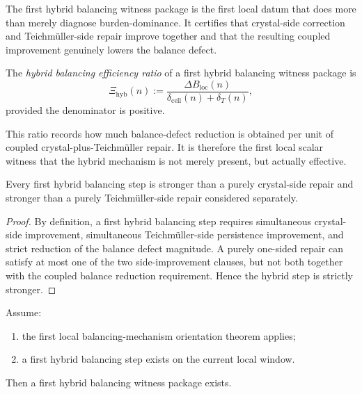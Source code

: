 \begin{remark}
\label{rem:meaning-of-the-hybrid-witness-package}
The first hybrid balancing witness package is the first local datum that does more than merely diagnose burden-dominance.
It certifies that crystal-side correction and Teichm\"uller-side repair improve together and that the resulting coupled improvement genuinely lowers the balance defect.
\end{remark}

\begin{definition}
\label{def:hybrid-balancing-efficiency-ratio}
The \emph{hybrid balancing efficiency ratio} of a first hybrid balancing witness package is
\[
 \Xi_{\mathrm{hyb}}(n)
 :=
 \frac{\Delta B_{\mathrm{loc}}(n)}{\delta_{\mathrm{cell}}(n)+\delta_{T}(n)},
\]
provided the denominator is positive.
\end{definition}

\begin{remark}
\label{rem:why-the-efficiency-ratio-is-useful}
This ratio records how much balance-defect reduction is obtained per unit of coupled crystal-plus-Teichm\"uller repair.
It is therefore the first local scalar witness that the hybrid mechanism is not merely present, but actually effective.
\end{remark}

\begin{proposition}
\label{prop:first-hybrid-balancing-step-stronger-than-separate-side-repairs}
Every first hybrid balancing step is stronger than a purely crystal-side repair and stronger than a purely Teichm\"uller-side repair considered separately.
\end{proposition}

\begin{proof}
By definition, a first hybrid balancing step requires simultaneous crystal-side improvement, simultaneous Teichm\"uller-side persistence improvement, and strict reduction of the balance defect magnitude.
A purely one-sided repair can satisfy at most one of the two side-improvement clauses, but not both together with the coupled balance reduction requirement.
Hence the hybrid step is strictly stronger.
\end{proof}

\begin{lemma}
\label{lem:first-hybrid-balancing-witness-lemma}
Assume:
\begin{enumerate}[leftmargin=2em,label=(\alph*)]
 \item the first local balancing-mechanism orientation theorem applies;
 \item a first hybrid balancing step exists on the current local window.
\end{enumerate}
Then a first hybrid balancing witness package exists.
\end{lemma}

